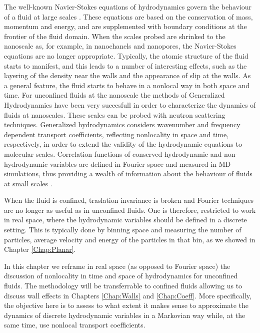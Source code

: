 \documentclass[a4paper,openright,12pt]{book}
\begin{document}
The well-known Navier-Stokes equations of hydrodynamics govern the behaviour of a fluid at large scales \cite{Bird1987, Clarke1995,Rubbert1968}. These equations are based on the conservation of mass, momentum and energy, and are supplemented with
boundary conditions  at the  frontier of the  fluid domain. When the
scales  probed are  shrinked  to  the nanoscale  as,  for example,  in
nanochanels and  nanopores, the Navier-Stokes equations  are no longer
appropriate. Typically,  the atomic structure  of the fluid  starts to
manifest, and this  leads to a number of interesting  effects, such as
the layering of the density near  the walls and the appearance of slip
at the walls.  As a general feature,  the fluid starts to  behave in a
nonlocal way  in both space and  time.  For unconfined fluids  at the
nanoscale the methods of Generalized Hydrodynamics \cite{Boon1980,Mountain1977,
 Hansen2013,Alley1984}  have been very succesfull  in order
to  characterize the  dynamics of  fluids  at nanoscales. These scales can  be
probed with neutron scattering techniques.  Generalized hydrodynamics
considers wavenumber  and frequency dependent  transport coefficients,
reflecting nonlocality in  space and time, respectively,  in order to
extend the validity of the hydrodynamic equations to molecular scales.
Correlation functions of conserved hydrodynamic  and non-hydrodynamic
variables are defined in Fourier space and measured in MD simulations,
thus providing a  wealth of information about the  behaviour of fluids
at small scales \cite{Chung1969,DeSchepper1988,Khayat1989}.

When  the  fluid is  confined,  traslation  invariance is  broken  and
Fourier  techniques  are   no  longer  as  useful   as  in  unconfined
fluids. One is therefore, restricted to  work in real space, where the
hydrodynamic variables should  be defined in a  discrete setting. This
is  typically  done by  binning  space  and  measuring the  number  of
particles, average velocity  and energy of the particles  in that bin, as we showed in Chapter \ref{Chap:Planar}.

In this chapter we reframe in  real space (as opposed
to Fourier space) the discussion of  nonlocality in time and space of
hydrodynamics for unconfined fluids. The  methodology will be  transferrable to
confined fluids allowing  us to discuss wall  effects in Chapters \ref{Chap:Walls} and \ref{Chap:Coeff}.  More  specifically, the
objective  here  is  to  assess  to what  extent  it  makes  sense  to
approximate  the  dynamics of  discrete  hydrodynamic  variables in  a
Markovian  way  while,  at  the same  time,  use  nonlocal  transport
coefficients. 
\end{document}
